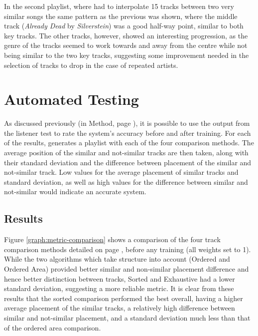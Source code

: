In the second playlist, where  had to interpolate 15 tracks between two very similar songs the same pattern as the previous was shown, where the middle track (\emph{Already Dead} by \emph{Silverstein}) was a good half-way point, similar to both key tracks. The other tracks, however, showed an interesting progression, as the genre of the tracks seemed to work towards and away from the centre while not being similar to the two key tracks, suggesting some improvement needed in the selection of tracks to drop in the case of repeated artists.
\pagebreak
\section{Automated Testing}
As discussed previously (in Method, page \pageref{text:method:weight_optimisation}), it is possible to use the output from the listener test to rate the system's accuracy before and after training. For each of the results,  generates a playlist with each of the four comparison methods. The average position of the similar and not-similar tracks are then taken, along with their standard deviation and the difference between placement of the similar and not-similar track. Low values for the average placement of similar tracks and standard deviation, as well as high values for the difference between similar and not-similar would indicate an accurate system.
\subsection{Results}
Figure \ref{graph:metric-comparison} shows a comparison of the four track comparison methods detailed on page \pageref{text:method:comparison_methods}, before any training (all weights set to 1). While the two algorithms which take structure into account (Ordered and Ordered Area) provided better similar and non-similar placement difference and hence better distinction between tracks, Sorted and Exhaustive had a lower standard deviation, suggesting a more reliable metric. It is clear from these results that the sorted comparison performed the best overall, having a higher average placement of the similar tracks, a relatively high difference between similar and not-similar placement, and a standard deviation much less than that of the ordered area comparison.

